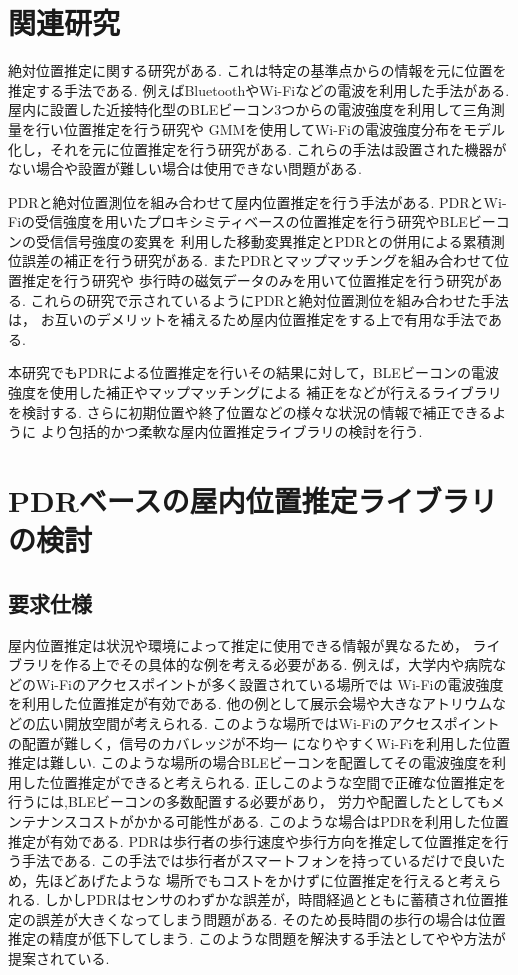 
\section{関連研究}
絶対位置推定に関する研究がある.
これは特定の基準点からの情報を元に位置を推定する手法である.
例えばBluetoothやWi-Fiなどの電波を利用した手法がある.
屋内に設置した近接特化型のBLEビーコン3つからの電波強度を利用して三角測量を行い位置推定を行う研究\cite{ble-indoor}や
GMMを使用してWi-Fiの電波強度分布をモデル化し，それを元に位置推定を行う研究\cite{wifi-gmm}がある.
これらの手法は設置された機器がない場合や設置が難しい場合は使用できない問題がある.

PDRと絶対位置測位を組み合わせて屋内位置推定を行う手法がある.
PDRとWi-Fiの受信強度を用いたプロキシミティベースの位置推定を行う研究\cite{pdr-wifi}やBLEビーコンの受信信号強度の変異を
利用した移動変異推定とPDRとの併用による累積測位誤差の補正を行う研究\cite{pdr-ble}がある.
またPDRとマップマッチングを組み合わせて位置推定を行う研究\cite{pdr-map}や
歩行時の磁気データのみを用いて位置推定を行う研究\cite{pdr-mag}がある.
これらの研究で示されているようにPDRと絶対位置測位を組み合わせた手法は，
お互いのデメリットを補えるため屋内位置推定をする上で有用な手法である.

本研究でもPDRによる位置推定を行いその結果に対して，BLEビーコンの電波強度を使用した補正やマップマッチングによる
補正をなどが行えるライブラリを検討する.
さらに初期位置や終了位置などの様々な状況の情報で補正できるように
より包括的かつ柔軟な屋内位置推定ライブラリの検討を行う.

\section{PDRベースの屋内位置推定ライブラリの検討}

\subsection{要求仕様}

屋内位置推定は状況や環境によって推定に使用できる情報が異なるため，
ライブラリを作る上でその具体的な例を考える必要がある.
例えば，大学内や病院などのWi-Fiのアクセスポイントが多く設置されている場所では
Wi-Fiの電波強度を利用した位置推定が有効である.
他の例として展示会場や大きなアトリウムなどの広い開放空間が考えられる.
このような場所ではWi-Fiのアクセスポイントの配置が難しく，信号のカバレッジが不均一
になりやすくWi-Fiを利用した位置推定は難しい.
このような場所の場合BLEビーコンを配置してその電波強度を利用した位置推定ができると考えられる.
正しこのような空間で正確な位置推定を行うには,BLEビーコンの多数配置する必要があり，
労力や配置したとしてもメンテナンスコストがかかる可能性がある.
このような場合はPDRを利用した位置推定が有効である.
PDRは歩行者の歩行速度や歩行方向を推定して位置推定を行う手法である.
この手法では歩行者がスマートフォンを持っているだけで良いため，先ほどあげたような
場所でもコストをかけずに位置推定を行えると考えられる.
しかしPDRはセンサのわずかな誤差が，時間経過とともに蓄積され位置推定の誤差が大きくなってしまう問題がある.
そのため長時間の歩行の場合は位置推定の精度が低下してしまう.
このような問題を解決する手法として\cite{pdr-wifi}や\cite{pdr-ble}や方法が提案されている.

